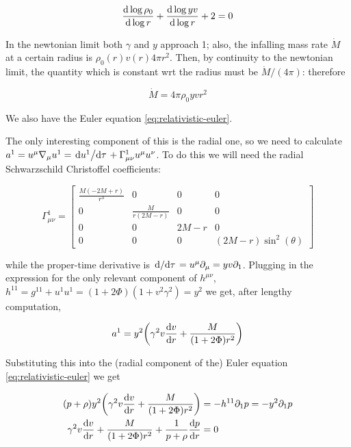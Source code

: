 \documentclass[main.tex]{subfiles}
\begin{document}
\begin{equation} \label{eq:differential-continuity}
  \dv{\log \rho_0}{\log r} +
  \dv{\log yv}{\log r} + 2 = 0
\end{equation}

In the newtonian limit both $\gamma$ and $y$ approach 1; also, the infalling mass rate $\Dot{M}$ at a certain radius is $\rho_0 (r) v(r) 4\pi r^2$. Then, by continuity to the newtonian limit, the quantity which is constant wrt the radius must be $\Dot{M} / (4\pi)$: therefore

\begin{equation} \label{eq:mass-conservation-integral}
  \dot{M} = 4 \pi\rho_0 yvr^2
\end{equation}

We also have the Euler equation \eqref{eq:relativistic-euler}.

The only interesting component of this is the radial one, so we need to calculate \(a^1 = u^\mu \nabla_\mu u^1 = \dv*{u^1}{\tau} + \Gamma^1_{\mu \nu} u^\mu u^\nu \). To do this we will need the radial Schwarzschild Christoffel coefficients:

\begin{equation}
  \Gamma^1_{\mu \nu} = \left[\begin{matrix}\frac{M \left(- 2 M + r\right)}{r^{3}} & 0 & 0 & 0\\0 & \frac{M}{r \left(2 M - r\right)} & 0 & 0\\0 & 0 & 2 M - r & 0\\0 & 0 & 0 & \left(2 M - r\right) \sin^{2}{\left(\theta \right)}\end{matrix}\right]
\end{equation}

while the proper-time derivative is \(\dv*{}{\tau} = u^\mu \partial_\mu = yv\partial_1\).
Plugging in the expression for the only relevant component of \(h^{\mu\nu}\), \(h^{11} = g^{11} + u^1 u^1 = (1 + 2 \Phi) (1 + v^2 \gamma^2) = y^2\)
we get, after lengthy computation,

\begin{equation}
  a^1 = y^2 \qty(\gamma^2 v \dv{v}{r} + \frac{M}{(1+ 2 \Phi) r^2})
\end{equation}

Substituting this into the (radial component of the) Euler equation \eqref{eq:relativistic-euler} we get

\begin{subequations}
\begin{align}
  (p + \rho) y^2 \qty(\gamma^2 v \dv{v}{r} + \frac{M}{(1+ 2 \Phi) r^2}) &= - h^{1 1} \partial_1 p = - y^2 \partial_1 p \\
   \gamma^2 v \dv{v}{r} + \frac{M}{(1+ 2 \Phi) r^2} + \frac{1}{p + \rho} \dv{p}{r} &= 0
  \label{eq:ideal-euler}
\end{align}
\end{subequations}
\end{document}
